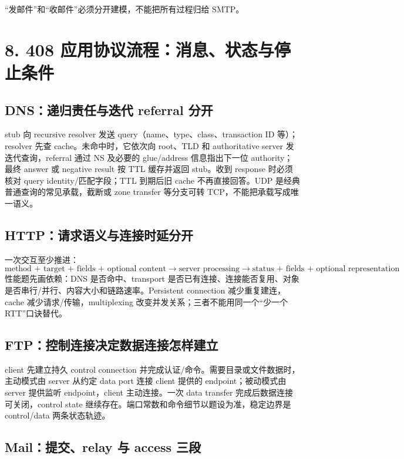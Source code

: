 \documentclass[UTF8,fontset=none,11pt,a4paper]{ctexart}
\begin{document}
``发邮件''和``收邮件''必须分开建模，不能把所有过程归给 SMTP。

\section{8. 408 应用协议流程：消息、状态与停止条件}

\subsection{DNS：递归责任与迭代 referral 分开}

stub 向 recursive resolver 发送 query（name、type、class、transaction ID 等）；resolver 先查 cache。未命中时，它依次向 root、TLD 和 authoritative server 发迭代查询，referral 通过 NS 及必要的 glue/address 信息指出下一位 authority；最终 answer 或 negative result 按 TTL 缓存并返回 stub。收到 response 时必须核对 query identity/匹配字段；TTL 到期后旧 cache 不再直接回答。UDP 是经典普通查询的常见承载，截断或 zone transfer 等分支可转 TCP，不能把承载写成唯一语义。

\subsection{HTTP：请求语义与连接时延分开}

一次交互至少推进：
\[
\boxed{\text{method + target + fields + optional content}
\to\text{server processing}
\to\text{status + fields + optional representation}}.
\]
性能题先画依赖：DNS 是否命中、transport 是否已有连接、连接能否复用、对象是否串行/并行、内容大小和链路速率。Persistent connection 减少重复建连，cache 减少请求/传输，multiplexing 改变并发关系；三者不能用同一个“少一个 RTT”口诀替代。

\subsection{FTP：控制连接决定数据连接怎样建立}

client 先建立持久 control connection 并完成认证/命令。需要目录或文件数据时，主动模式由 server 从约定 data port 连接 client 提供的 endpoint；被动模式由 server 提供监听 endpoint，client 主动连接。一次 data transfer 完成后数据连接可关闭，control state 继续存在。端口常数和命令细节以题设为准，稳定边界是 control/data 两条状态轨迹。

\subsection{Mail：提交、relay 与 access 三段}
\end{document}
